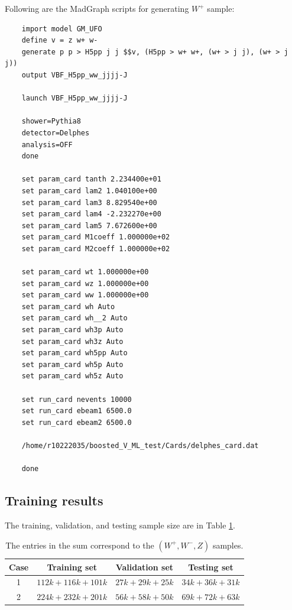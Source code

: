 \documentclass[12pt]{article}
\begin{document}
	Following are the MadGraph scripts for generating $W^{+}$ sample:
	\begin{verbatim}
	import model GM_UFO
	define v = z w+ w-
	generate p p > H5pp j j $$v, (H5pp > w+ w+, (w+ > j j), (w+ > j j))
	output VBF_H5pp_ww_jjjj-J

	launch VBF_H5pp_ww_jjjj-J

	shower=Pythia8
	detector=Delphes
	analysis=OFF
	done

	set param_card tanth 2.234400e+01
	set param_card lam2 1.040100e+00
	set param_card lam3 8.829540e+00
	set param_card lam4 -2.232270e+00
	set param_card lam5 7.672600e+00
	set param_card M1coeff 1.000000e+02
	set param_card M2coeff 1.000000e+02

	set param_card wt 1.000000e+00
	set param_card wz 1.000000e+00
	set param_card ww 1.000000e+00
	set param_card wh Auto
	set param_card wh__2 Auto
	set param_card wh3p Auto
	set param_card wh3z Auto
	set param_card wh5pp Auto
	set param_card wh5p Auto
	set param_card wh5z Auto

	set run_card nevents 10000
	set run_card ebeam1 6500.0
	set run_card ebeam2 6500.0

	/home/r10222035/boosted_V_ML_test/Cards/delphes_card.dat

	done
	\end{verbatim}

	\subsection{Training results}%
	\label{sub:training_results}
		The training, validation, and testing sample size are in Table \ref{tab:sample_size_old}.
		\begin{table}[htpb]
			\centering
			\caption{The entries in the sum correspond to the $(W^{+}, W^{-}, Z)$ samples.}
			\label{tab:sample_size_old}
			\begin{tabular}{c|c|c|c}
			Case & Training set     & Validation set & Testing set   \\ \hline
			1    & $112k+116k+101k$ & $27k+29k+25k$ & $34k+36k+31k$ \\
			2    & $224k+232k+201k$ & $56k+58k+50k$ & $69k+72k+63k$ \\
			\end{tabular}
		\end{table}
\end{document}
